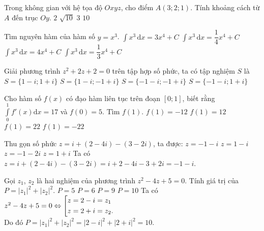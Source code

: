 \begin{ex}%
	Trong không gian với hệ tọa độ $Oxyz$, cho điểm $A(3;2;1)$. Tính khoảng cách từ $A$ đến trục $Oy$.
	\choice
	{$2$}
	{\True $\sqrt{10}$}
	{$3$}
	{$10$}
\end{ex}

\begin{ex}%
	Tìm nguyên hàm của hàm số $y=x^3$.
	\choice
	{$\displaystyle\int x^3\mathrm{\,d}x=3x^4+C$}
	{\True $\displaystyle\int x^3\mathrm{\,d}x=\dfrac{1}{4}x^4+C$}
	{$\displaystyle\int x^3\mathrm{\,d}x=4x^4+C$}
	{$\displaystyle\int x^3\mathrm{\,d}x=\dfrac{1}{3}x^4+C$}
\end{ex}

\begin{ex}%
	Giải phương trình $z^2+2z+2=0$  trên tập hợp số phức, ta có tập nghiệm $S$ là
	\choice
	{$S=\{1-i; 1+i\}$}
	{$S=\{1-i; -1+i\}$}
	{\True $S=\{-1-i; -1+i\}$}
	{$S=\{-1-i; 1+i\}$}
\end{ex}

\begin{ex}%
Cho hàm số $f(x)$ có đạo hàm liên tục trên đoạn $\left[0;1\right]$, biết rằng $\displaystyle\int\limits_0^1f'(x)\mathrm{d}x=17$ và $f(0)=5$. Tìm $f(1)$.
\choice
{$f(1)=-12$}
{$f(1)=12$}
{\True $f(1)=22$}
{$f(1)=-22$}
\end{ex}

\begin{ex}%
Thu gọn số phức $z=i+(2-4i)-(3-2i)$, ta được:
\choice
{\True $z=-1-i$}
{$z=1-i$}
{$z=-1-2i$}
{$z=1+i$}
\loigiai
{Ta có $z=i+(2-4i)-(3-2i)=i+2-4i-3+2i=-1-i$.
}
\end{ex}

\begin{ex}%
Gọi $z_1$, $z_2$ là hai nghiệm của phương trình $z^2-4z+5=0$. Tính giá trị của $P=\left|z_1\right|^2+\left|z_2\right|^2$.
\choice
{$P=5$}
{$P=6$}
{$P=9$}
{\True $P=10$}
\loigiai
{Ta có $z^2-4z+5=0\Leftrightarrow \left[\begin{aligned}&z=2-i=z_1\\&z=2+i=z_2.\end{aligned}\right.$\\Do đó $P=\left|z_1\right|^2+\left|z_2\right|^2=\left|2-i\right|^2+\left|2+i\right|^2=10$.}
\end{ex}

